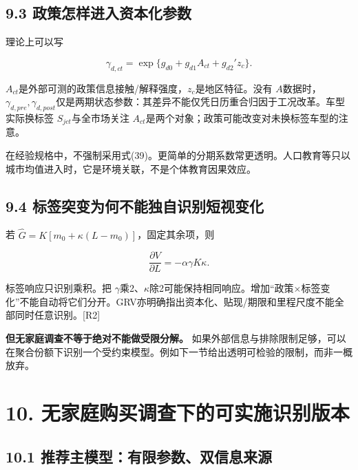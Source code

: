\documentclass[
  11pt,
]{article}
\begin{document}
\subsection{9.3
政策怎样进入资本化参数}\label{ux653fux7b56ux600eux6837ux8fdbux5165ux8d44ux672cux5316ux53c2ux6570}

理论上可以写

\[
\gamma_{d,ct}
=\exp\{g_{d0}+g_{d1}A_{ct}+g_{d2}'z_c\}.
\tag{39}
\]

\(A_{ct}\)是外部可测的政策信息接触/解释强度，\(z_c\)是地区特征。没有
\(A\)数据时，\(\gamma_{d,pre},\gamma_{d,post}\)仅是两期状态参数：其差异不能仅凭日历重合归因于工况改革。车型实际换标签
\(S_{jct}\)与全市场关注
\(A_{ct}\)是两个对象；政策可能改变对未换标签车型的注意。

在经验规格中，不强制采用式(39)。更简单的分期系数常更透明。人口教育等只以城市均值进入时，它是环境关联，不是个体教育因果效应。

\subsection{9.4
标签突变为何不能独自识别短视变化}\label{ux6807ux7b7eux7a81ux53d8ux4e3aux4f55ux4e0dux80fdux72ecux81eaux8bc6ux522bux77edux89c6ux53d8ux5316}

若 \(\widehat G=K[m_0+\kappa(L-m_0)]\)，固定其余项，则

\[
\frac{\partial V}{\partial L}
=-\alpha\gamma K\kappa.
\tag{40}
\]

标签响应只识别乘积。把
\(\gamma\)乘2、\(\kappa\)除2可能保持相同响应。增加``政策×标签变化''不能自动将它们分开。GRV亦明确指出资本化、贴现/期限和里程尺度不能全部同时任意识别。{[}R2{]}

\textbf{但无家庭调查不等于绝对不能做受限分解。}
如果外部信息与排除限制足够，可以在聚合份额下识别一个受约束模型。例如下一节给出透明可检验的限制，而非一概放弃。

\section{10.
无家庭购买调查下的可实施识别版本}\label{ux65e0ux5bb6ux5eadux8d2dux4e70ux8c03ux67e5ux4e0bux7684ux53efux5b9eux65bdux8bc6ux522bux7248ux672c}

\subsection{10.1
推荐主模型：有限参数、双信息来源}\label{ux63a8ux8350ux4e3bux6a21ux578bux6709ux9650ux53c2ux6570ux53ccux4fe1ux606fux6765ux6e90}
\end{document}
